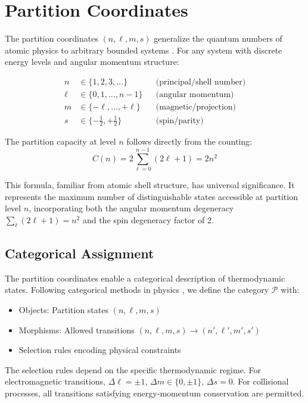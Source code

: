 \section{Partition Coordinates}
\label{sec:partition}

The partition coordinates $(n, \ell, m, s)$ generalize the quantum numbers of atomic physics to arbitrary bounded systems \cite{griffiths2018introduction}. For any system with discrete energy levels and angular momentum structure:

\begin{align}
n &\in \{1, 2, 3, \ldots\} & &\text{(principal/shell number)} \\
\ell &\in \{0, 1, \ldots, n-1\} & &\text{(angular momentum)} \\
m &\in \{-\ell, \ldots, +\ell\} & &\text{(magnetic/projection)} \\
s &\in \{-\tfrac{1}{2}, +\tfrac{1}{2}\} & &\text{(spin/parity)}
\end{align}

The partition capacity at level $n$ follows directly from the counting:
\begin{equation}
C(n) = 2\sum_{\ell=0}^{n-1}(2\ell + 1) = 2n^2
\label{eq:capacity}
\end{equation}

This formula, familiar from atomic shell structure, has universal significance. It represents the maximum number of distinguishable states accessible at partition level $n$, incorporating both the angular momentum degeneracy $\sum_{\ell}(2\ell+1) = n^2$ and the spin degeneracy factor of 2.

\subsection{Categorical Assignment}

The partition coordinates enable a categorical description of thermodynamic states. Following categorical methods in physics \cite{coecke2017picturing, baez2010physics}, we define the category $\mathcal{P}$ with:
\begin{itemize}
    \item Objects: Partition states $(n, \ell, m, s)$
    \item Morphisms: Allowed transitions $(n, \ell, m, s) \to (n', \ell', m', s')$
    \item Selection rules encoding physical constraints
\end{itemize}

The selection rules depend on the specific thermodynamic regime. For electromagnetic transitions, $\Delta\ell = \pm 1$, $\Delta m \in \{0, \pm 1\}$, $\Delta s = 0$. For collisional processes, all transitions satisfying energy-momentum conservation are permitted.

